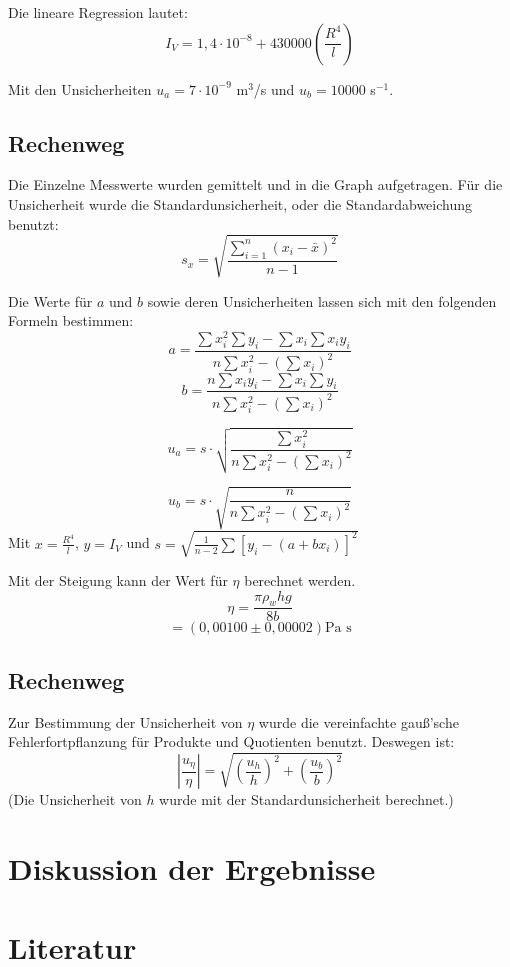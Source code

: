 \documentclass[11pt,a4paper]{article}
\begin{document}
Die lineare Regression lautet:
$$ I_V = 1,4\cdot 10^{-8} + 430000 (\frac{R^4}{l})$$

Mit den Unsicherheiten $u_a = 7\cdot 10^{-9}$ m$^3$/s und $u_b = 10000$ s$^{-1}$. 

\begin{tcolorbox}[colback=white]
	\subsection{Rechenweg}
	Die Einzelne Messwerte wurden gemittelt und in die Graph aufgetragen. Für die Unsicherheit wurde die Standardunsicherheit, oder die Standardabweichung benutzt:
	$$s_x = \sqrt{\frac{\sum_{i=1}^{n}(x_i-\bar{x})^2}{n-1}} $$
	
	Die Werte für $a$ und $b$ sowie deren Unsicherheiten lassen sich mit den folgenden Formeln bestimmen:
	$$a = \frac{
	\sum x_i^2 \sum y_i - \sum x_i \sum x_iy_i
}{
n \sum x_i^2 - (\sum x_i)^2
}$$
$$ b = \frac{
n\sum x_iy_i-\sum x_i \sum y_i
}{
n \sum x_i^2 - (\sum x_i)^2
}$$

$$u_a = s\cdot \sqrt{
\frac{
\sum x_i^2
}{
n\sum x_i^2 - (\sum x_i)^2
}}$$

$$u_b = s\cdot \sqrt{
\frac{
n
}{
n\sum x_i^2 - (\sum x_i)^2
}}$$
Mit $x = \frac{R^4}{l}$, $y = I_V$ und $s = \sqrt{
\frac{1}{n-2}\sum [y_i-(a+bx_i)]^2}$
\end{tcolorbox}

Mit der Steigung kann der Wert für $\eta$ berechnet werden. 
$$\eta = \frac{\pi \rho_w hg}{8b}$$
$$ = (0,00100 \pm 0,00002) \textrm{Pa s} $$

\begin{tcolorbox}[colback=white]
\subsection{Rechenweg}
Zur Bestimmung der Unsicherheit von $\eta$ wurde die vereinfachte gauß'sche Fehlerfortpflanzung für Produkte und Quotienten benutzt. Deswegen ist:
$$\left\vert \frac{u_\eta}{\eta} \right \vert 
= \sqrt{(\frac{u_h}{h})^2+(\frac{u_b}{b})^2} $$
(Die Unsicherheit von $h$ wurde mit der Standardunsicherheit berechnet.)
	
\end{tcolorbox}


\section{Diskussion der Ergebnisse}

\section{Literatur}

	
	
	
	
	
	
	
	
	
	
	
	
\end{document}

